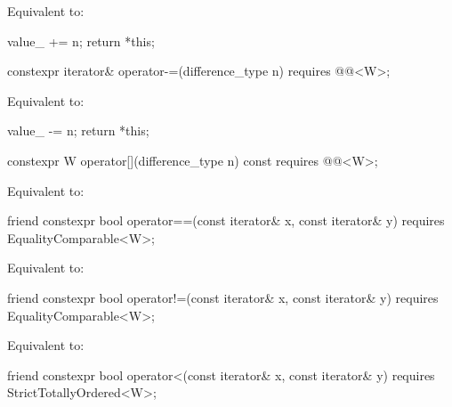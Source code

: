 \begin{itemdescr}
\pnum
\effects Equivalent to:
\begin{codeblock}
value_ += n;
return *this;
\end{codeblock}
\end{itemdescr}

\begin{itemdecl}
constexpr iterator& operator-=(difference_type n)
  requires @@<W>;
\end{itemdecl}

\begin{itemdescr}
\pnum
\effects Equivalent to:
\begin{codeblock}
value_ -= n;
return *this;
\end{codeblock}
\end{itemdescr}

\begin{itemdecl}
constexpr W operator[](difference_type n) const
  requires @@<W>;
\end{itemdecl}

\begin{itemdescr}
\pnum
\effects Equivalent to: 
\end{itemdescr}

\begin{itemdecl}
friend constexpr bool operator==(const iterator& x, const iterator& y)
  requires EqualityComparable<W>;
\end{itemdecl}

\begin{itemdescr}
\pnum
\effects Equivalent to: 
\end{itemdescr}

\begin{itemdecl}
friend constexpr bool operator!=(const iterator& x, const iterator& y)
  requires EqualityComparable<W>;
\end{itemdecl}

\begin{itemdescr}
\pnum
\effects Equivalent to: 
\end{itemdescr}

\begin{itemdecl}
friend constexpr bool operator<(const iterator& x, const iterator& y)
  requires StrictTotallyOrdered<W>;
\end{itemdecl}


